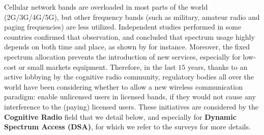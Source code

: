 Cellular network bands are overloaded in most parts of the world (2G/3G/4G/5G), but other frequency bands (such as military, amateur radio and paging frequencies) are less utilized.
Independent studies performed in some countries confirmed that observation, and concluded that spectrum usage highly depends on both time and place, as shown by \cite{Lopez2009spectral} for instance.
Moreover, the fixed spectrum allocation prevents
the introduction of new services, especially for low-cost or small markets equipment.
Therefore, in the last $15$ years, thanks to an active lobbying by the cognitive radio community,
regulatory bodies all over the world have been considering whether to allow
a new wireless communication paradigm:
enable unlicensed users in licensed bands, if they would not cause any interference to the (paying) licensed users.
These initiatives are considered by the \textbf{Cognitive Radio} field that we detail below, and especially for \textbf{Dynamic Spectrum Access (DSA)},
for which we refer to the surveys \cite{akyildiz2006next,garhwal2012survey} for more details.


